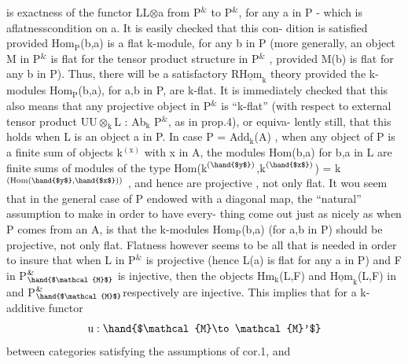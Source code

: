 
is exactness of the functor  L\hand{$\mapsto$}L$\otimes$a  from P$^{\&}$ to P$^{\&}$, for any a in P
- which is aflatnesscondition on a.  It is easily checked that this con-%
dition is satisfied provided  Hom$_{\mathrm{P}}$(b,a)  is a flat k-module,  for any
b in P (more generally,  an object M in P$^{\&}$ is flat for the tensor product
structure in P$^{\&}$ ,  provided M(b) is flat for any b in P).  Thus,  there
will be a satisfactory $\mathrm{R}\underline{\mathrm{Hom}}_{\mathrm{k}}$ theory provided the k-modules Hom$_{\mathrm{P}}$(b,a),
for a,b in P,  are k-flat.  It is immediately checked that this also
means that any projective object in P$^{\&}$ is ``k-flat'' (with respect to
external tensor product U\hand{$\mapsto$}U$\otimes_{\mathrm{k}}$L  :  Ab$_{\mathrm{k}}$ \hand{$\to$}P$^{\&}$, as in prop.4), or equiva-%
lently still,  that this holds when L is an object a in P.  In case
P = Add$_{\mathrm{k}}$(A) ,  when any object of P is a finite sum of objects k$^{(\mathrm{x})}$ with
x in A,  the modules Hom(b,a) for b,a in L are finite sums of modules
of the type  Hom(k$^{(\hand{$y$})}$,k$^{(\hand{$x$})}$) = k$^{(\mathrm{Hom}(\hand{$y$},\hand{$x$}))}$ , and hence are projective ,
not only flat.  It wou seem that in the general case of P endowed with
a diagonal map,  the ``natural'' assumption to make in order to have every-%
thing come out just as nicely as when P comes from an A,  is that the
k-modules Hom$_{\mathrm{P}}$(b,a)  (for a,b in P)  should be projective,  not only
flat.  Flatness however seems to be all that is needed in order to insure
that when L in P$^{\&}$ is projective  (hence L(a) is flat for any a in P)
and F in P$^{\&}_{\hand{$\mathcal{M}$}}$ is injective,  then the objects Hm$_{\mathrm{k}}$(L,F)  and $\underline{\mathrm{Hom}}_{\mathrm{k}}$(L,F)
in  and  P$^{\&}_{\hand{$\mathcal{M}$}}$respectively are injective.  This implies that for a
 k-additive functor
\[ \mathrm{u}: \hand{$\mathcal{M}\to\mathcal{M}'$} \]
between categories\deleted{\unsure{,}} satisfying the assumptions of cor.1,  and 
